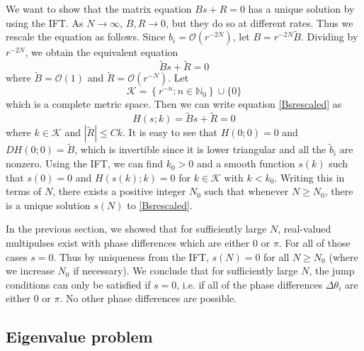 \documentclass[12pt]{article}
\def\N{{\mathbb N}}
\begin{document}
We want to show that the matrix equation $B s + R = 0$ has a unique solution by using the IFT. As $N \rightarrow \infty$, $B, R \rightarrow 0$, but they do so at different rates. Thus we rescale the equation as follows. Since $b_i = \mathcal{O}(r^{-2N})$, let $B = r^{-2N} \tilde{B}$. Dividing by $r^{-2N}$, we obtain the equivalent equation
\begin{equation}\label{Bsrescaled}
\tilde{B}s + \tilde{R} = 0
\end{equation}
where $\tilde{B} = \mathcal{O}(1)$ and $\tilde{R} = \mathcal{O}(r^{-N})$. Let 
\[
\mathcal{K} = \left\{ r^{-n} : n \in \N_0 \right\} \cup \{ 0 \}
\]
which is a complete metric space. Then we can write equation \eqref{Bsrescaled} as
\begin{equation}\label{Htildeeq}
H(s; k) = \tilde{B}s + \tilde{R} = 0
\end{equation}
where $k \in \mathcal{K}$ and $|\tilde{R}| \leq C k$. It is easy to see that $H(0; 0) = 0$ and $DH(0; 0) = \tilde{B}$, which is invertible since it is lower triangular and all the $\tilde{b}_i$ are nonzero. Using the IFT, we can find $k_0 > 0$ and a smooth function $s(k)$ such that $s(0) = 0$ and $H(s(k); k) = 0$ for $k \in \mathcal{K}$ with $k < k_0$. Writing this in terms of $N$, there exists a positive integer $N_0$ such that whenever $N \geq N_0$, there is a unique solution $s(N)$ to \eqref{Bsrescaled}. 

In the previous section, we showed that for sufficiently large $N$, real-valued multipulses exist with phase differences which are either 0 or $\pi$. For all of those cases $s = 0$. Thus by uniqueness from the IFT, $s(N) = 0$ for all $N \geq N_0$ (where we increase $N_0$ if necessary). We conclude that for sufficiently large $N$, the jump conditions can only be satisfied if $s = 0$, i.e. if all of the phase differences $\Delta \theta_i$ are either 0 or $\pi$. No other phase differences are possible.

\subsection{Eigenvalue problem}
\end{document}
